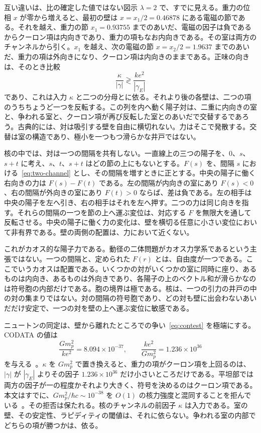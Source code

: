 \documentclass[a4paper]{article}
\begin{document}
互い違いは、比の確定した値ではない図示 \(\lambda=2\) で、すでに見える。重力の位相 \(x\) が零から増えると、最初の壁は \(x=x_1/2=0.46878\) にある電磁の節である。それを越え、重力の節 \(x_1=0.93755\) までのあいだ、電磁の因子は負であるからクーロン項は内向きであり、重力の項もなお内向きである。その室は両方のチャンネルから引く。\(x_1\) を越え、次の電磁の節 \(x=x_2/2=1.9637\) までのあいだ、重力の項は外向きになり、クーロン項は内向きのままである。正味の向きは、そのとき比較
\begin{equation}
\label{eq:contest}
\frac{\kappa}{|\gamma|}
  \gtrless
  \frac{k e^{2}}{|\gamma_E|}
\end{equation}
であり、これは入力 \(\kappa\) と二つの分母とに依る。それより後の各壁は、二つの項のうちちょうど一つを反転する。この列を内へ動く陽子対は、二重に内向きの室と、争われる室と、クーロン項が再び反転した室とのあいだで交替するであろう。古典的には、対は吸引する壁を自由に横切れない。力はそこで発散する。交替は室の構造であり、極小を一つもつ滑らかな井戸ではない。

核の中では、対は一つの間隔を共有しない。一直線上の三つの陽子を、\(0\)、\(s\)、\(s+t\) に考え、\(s\)、\(t\)、\(s+t\) はどの節の上にもないとする。\(F(s)\) を、間隔 \(s\) における~\eqref{eq:two-channel} とし、その間隔を増すときに正とする。中央の陽子に働く右向きの力は \(F(s)-F(t)\) である。左の間隔が内向きの室にあり \(F(s)<0\)、右の間隔が外向きの室にあり \(F(t)>0\) ならば、差は負である。左の相手は中央の陽子を左へ引き、右の相手はそれを左へ押す。二つの力は同じ向きを指す。それらの間隔の一つを節の上へ運ぶ変位は、対応する \(F\) を無限大を通して反転させる。中央の陽子に働く力の変化は、壁を横切る任意に小さい変位において非有界である。壁の両側の配置は、力において近くない。

これがカオス的な陽子力である。動径の二体問題がカオス力学系であるという主張ではない。一つの間隔と、定められた \(F(r)\) とは、自由度が一つである。ここでいうカオスは配置である。いくつかの対がいくつかの室に同時に座り、あるものは内向き、あるものは外向きであり、各陽子の上のベクトル和が滑らかなのは符号胞の内部だけである。胞の境界は極である。核は、一つの引力の井戸の中の対の集まりではない。対の間隔の符号胞であり、どの対も壁に出会わないあいだだけ安定で、一つの対を壁の上へ運ぶ変位に敏感である。

ニュートンの同定は、壁から離れたところでの争い~\eqref{eq:contest} を極端にする。CODATA の値は
\begin{equation}
\label{eq:ratio}
\frac{G m_p^{2}}{k e^{2}}=8.094\times 10^{-37},
\qquad
\frac{k e^{2}}{G m_p^{2}}=1.236\times 10^{36}
\end{equation}
を与える~\cite{codata2018}。\(\kappa\) を \(G m_p^2\) で置き換えると、重力の項がクーロン項を上回るのは、\(|\gamma|\) が \(|\gamma_E|\) よりその因子 \(1.236\times 10^{36}\) だけ小さいところだけである。平坦部では両方の因子が一の程度かそれより大きく、符号を決めるのはクーロン項である。本文はすでに、\(G m_p^{2}/\hbar c\sim 10^{-38}\) を \(O(1)\) の核力強度と混同することを拒んでいる~\cite{dst-main}。その拒否は保たれる。核のチャンネルの前因子 \(\kappa\) は入力である。室の壁、その安定性、ラピディティの閾値は、それに依らない。争われる室の内部でどちらの項が勝つかは、依る。
\end{document}
